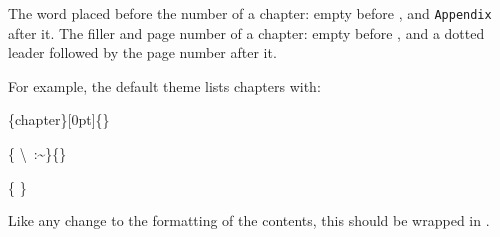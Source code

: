 		{
			The word placed before the number of a chapter: empty before , and \texttt{Appendix} after it.
		}
		{
			The filler and page number of a chapter: empty before , and a dotted leader followed by the page number after it.
		}

		For example, the default theme lists chapters with:
		\begin{Code}
			\{chapter\}[0pt]\{\}

			\{ \textbackslash{}~:\textasciitilde{}\}\{\}

			\{ \}
		\end{Code}
		Like any change to the formatting of the contents, this should be wrapped in  .
